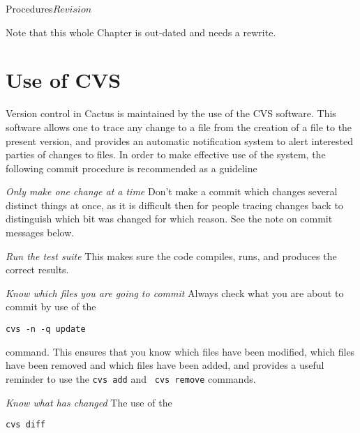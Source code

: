 
\begin{cactuspart}{2}{Procedures}{}{$Revision$}
\renewcommand{\thepage}{\Alph{part}\arabic{page}}

Note that this whole Chapter is out-dated and needs a rewrite.


\chapter{Use of CVS} 

Version control in Cactus is maintained by the use of the CVS
software.  This software allows one to trace any change to a file from 
the creation of a file to the present version, and provides an
automatic notification system to alert interested parties of changes
to files.  In order to make effective use of the system, the following 
commit procedure is recommended as a guideline

\begin{Lentry}
\item[{\em Only make one change at a time}]
Don't make a commit which changes several distinct things at once, as
it is difficult then for people tracing changes back to distinguish
which bit was changed for which reason.  See the note on commit
messages below.
\item[{\em Run the test suite}]
This makes sure the code compiles, runs, and produces the correct results. 
\item[{\em Know which files you are going to commit}]
Always check what you are about to commit by use of the

{\tt cvs -n -q update} 

command.  This ensures that you know which files have been modified,
which files have been removed and which files have been added, and
provides a useful reminder to use the {\tt \verb.cvs add.} and {\tt
\verb.cvs remove.} commands.
\item[{\em Know what has changed}]
The use of the

{\tt cvs diff} 


\end{Lentry}
\end{cactuspart}
